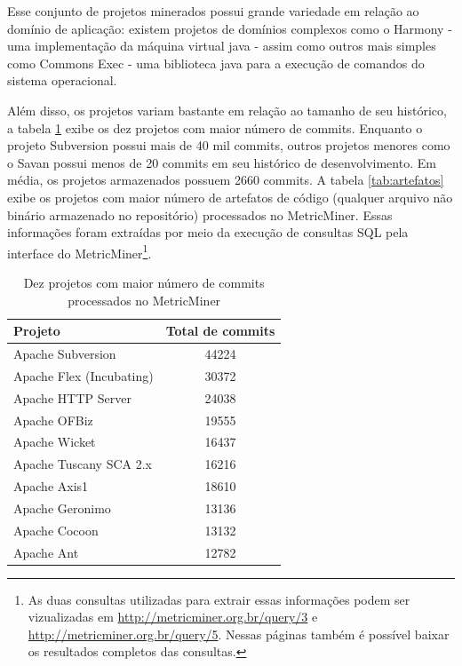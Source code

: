 \documentclass[a4paper, 12pt, twoside]{book}
\begin{document}
        Esse conjunto de projetos minerados possui grande variedade em relação ao domínio de aplicação: existem projetos de domínios complexos como o Harmony - uma implementação da máquina virtual java - assim como outros mais simples como Commons Exec - uma biblioteca java para a execução de comandos do sistema operacional. 

        Além disso, os projetos variam bastante em relação ao tamanho de seu histórico, a tabela \ref{tab:commits} exibe os dez projetos com maior número de commits. Enquanto o projeto Subversion possui mais de 40 mil commits, outros projetos menores como o Savan possui menos de 20 commits em seu histórico de desenvolvimento. Em média, os projetos armazenados possuem 2660 commits. A tabela \ref{tab:artefatos} exibe os projetos com maior número de artefatos de código (qualquer arquivo não binário armazenado no repositório) processados no MetricMiner. Essas informações foram extraídas por meio da execução de consultas SQL pela interface do MetricMiner\footnote{As duas consultas utilizadas para extrair essas informações podem ser vizualizadas em \url{http://metricminer.org.br/query/3} e \url{http://metricminer.org.br/query/5}. Nessas páginas também é possível baixar os resultados completos das consultas.}.

        \begin{table}\begin{center}
        \begin{tabular}{| p{6cm} | c |}
            \hline                        
            \textbf{Projeto} & \textbf{Total de commits} \\
            \hline                        
            Apache Subversion & 44224 \\
            \hline
            Apache Flex (Incubating) & 30372 \\
            \hline
            Apache HTTP Server & 24038 \\
            \hline
            Apache OFBiz & 19555 \\
            \hline
            Apache Wicket & 16437 \\
            \hline
            Apache Tuscany SCA 2.x & 16216 \\
            \hline
            Apache Axis1 & 18610 \\
            \hline
            Apache Geronimo & 13136 \\
            \hline
            Apache Cocoon & 13132 \\
            \hline
            Apache Ant & 12782 \\
            \hline
        \end{tabular}
        \caption{Dez projetos com maior número de commits processados no MetricMiner \label{tab:commits}}
        \end{center}\end{table}
\end{document}
